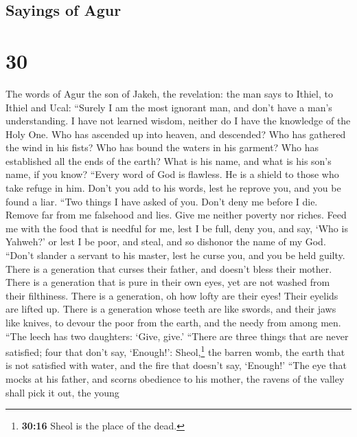\hypertarget{sayings-of-agur}{%
\subsection{Sayings of Agur}\label{sayings-of-agur}}

\hypertarget{section-29}{%
\section{30}\label{section-29}}

 The words of Agur the son of Jakeh, the revelation: the
man says to Ithiel, to Ithiel and Ucal:  ``Surely I am the
most ignorant man, and don't have a man's understanding. 
I have not learned wisdom, neither do I have the knowledge of the Holy
One.  Who has ascended up into heaven, and descended? Who
has gathered the wind in his fists? Who has bound the waters in his
garment? Who has established all the ends of the earth? What is his
name, and what is his son's name, if you know?  ``Every
word of God is flawless. He is a shield to those who take refuge in him.
 Don't you add to his words, lest he reprove you, and you
be found a liar.  ``Two things I have asked of you. Don't
deny me before I die.  Remove far from me falsehood and
lies. Give me neither poverty nor riches. Feed me with the food that is
needful for me,  lest I be full, deny you, and say, `Who
is Yahweh?' or lest I be poor, and steal, and so dishonor the name of my
God.  ``Don't slander a servant to his master, lest he
curse you, and you be held guilty.  There is a generation
that curses their father, and doesn't bless their mother.
 There is a generation that is pure in their own eyes,
yet are not washed from their filthiness.  There is a
generation, oh how lofty are their eyes! Their eyelids are lifted up.
 There is a generation whose teeth are like swords, and
their jaws like knives, to devour the poor from the earth, and the needy
from among men.  ``The leech has two daughters: `Give,
give.' ``There are three things that are never satisfied; four that
don't say, `Enough!':  Sheol,\footnote{\textbf{30:16}
  Sheol is the place of the dead.} the barren womb, the earth that is
not satisfied with water, and the fire that doesn't say, `Enough!'
 ``The eye that mocks at his father, and scorns obedience
to his mother, the ravens of the valley shall pick it out, the young
